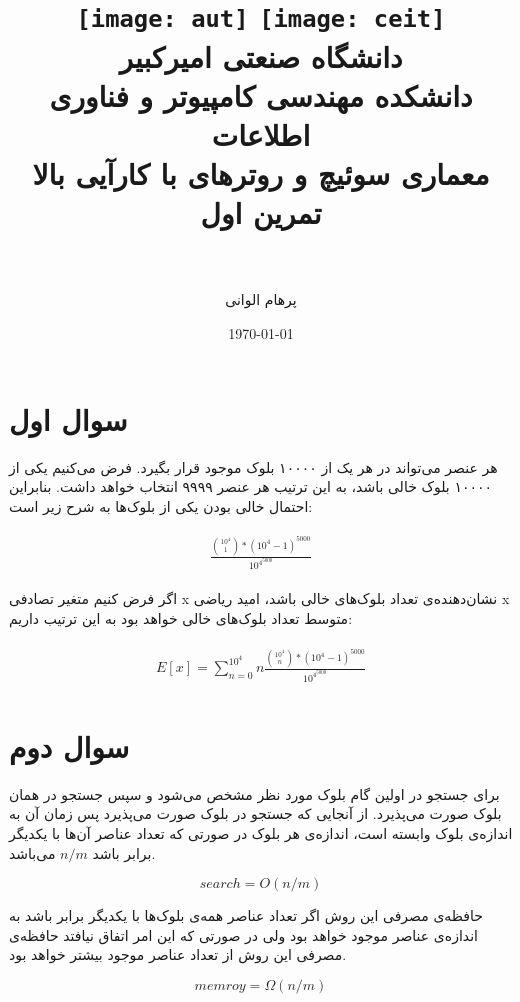 \documentclass[paper=a4, fontsize=11pt]{article}
\title{
\normalfont\normalsize
\texttt{[image: aut]}
\hspace{5cm}
\texttt{[image: ceit]} \\
\textsc دانشگاه صنعتی امیرکبیر \\
\textsc دانشکده مهندسی کامپیوتر و فناوری اطلاعات
\horrule{0.5pt} \\ [0.4cm] %
\huge معماری سوئیچ و روترهای با کارآیی بالا \\ %
\huge تمرین اول \\ %
\horrule{2pt} \\ [0.5cm] %
}
\author{پرهام الوانی}
\date{\normalsize\today} %
\numberwithin{equation}{section} %
\numberwithin{figure}{section} %
\numberwithin{table}{section} %
\begin{document}
\maketitle %

\section{سوال اول}
\par
هر عنصر می‌تواند در هر یک از ۱۰۰۰۰ بلوک موجود قرار بگیرد.
فرض می‌کنیم یکی از ۱۰۰۰۰ بلوک خالی باشد، به این ترتیب هر عنصر ۹۹۹۹ انتخاب خواهد داشت.
بنابراین احتمال خالی بودن یکی از بلوک‌ها به شرح زیر است:


\begin{align}
\begin{split}
    \frac{\binom{10^4}{1} * (10^4-1)^{5000}}{10^{4^{5000}}}
\end{split}
\end{align}

\par
اگر فرض کنیم متغیر تصادفی x نشان‌دهنده‌ی تعداد بلوک‌های خالی باشد،
امید ریاضی x متوسط تعداد بلوک‌های خالی خواهد بود
به این ترتیب داریم:

\begin{align}
\begin{split}
    E[x] = \sum_{n = 0}^{10^4}n\frac{\binom{10^4}{n} * (10^4-1)^{5000}}{10^{4^{5000}}}
\end{split}
\end{align}

\section{سوال دوم}
\par
برای جستجو در اولین گام بلوک مورد نظر مشخص می‌شود و سپس جستجو در همان بلوک صورت می‌پذیرد.
از آنجایی که جستجو در بلوک صورت می‌پذیرد پس زمان آن به اندازه‌ی بلوک وابسته است،
اندازه‌ی هر بلوک در صورتی که تعداد عناصر آن‌ها با یکدیگر برابر باشد
$n/m$
می‌باشد.

$$
search = O(n/m)
$$

\par
حافظه‌ی مصرفی این روش اگر تعداد عناصر همه‌ی بلوک‌ها با یکدیگر برابر باشد
به اندازه‌ی عناصر موجود خواهد بود ولی
در صورتی که این امر اتفاق نیافتد
حافظه‌ی مصرفی این روش از تعداد عناصر موجود بیشتر خواهد بود.

$$
memroy = \Omega(n/m)
$$
\end{document}
